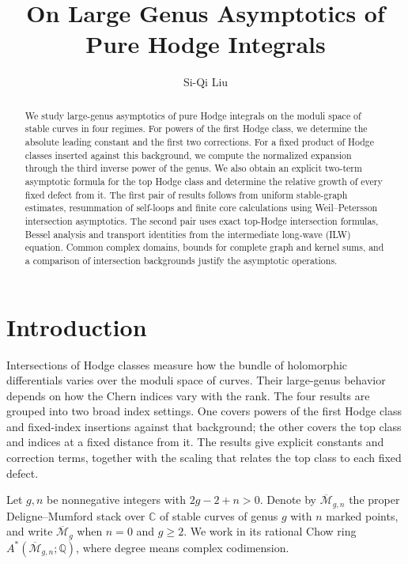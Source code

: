 \documentclass[a4paper,10pt]{article}
\numberwithin{equation}{section}
\newcommand{\MM}{\overline{\mathcal{M}}}
\theoremstyle{paperplain}
\theoremstyle{paperremark}
\theoremstyle{paperplain}
\begin{document}
\title{On Large Genus Asymptotics of \\
Pure Hodge Integrals}
\author{Si-Qi Liu}
\date{}
\maketitle

\begin{abstract}
We study large-genus asymptotics of pure Hodge integrals on the
moduli space of stable curves in four regimes. For powers of the
first Hodge class, we determine the absolute leading constant and
the first two corrections. For a fixed product of Hodge classes
inserted against this background, we compute the normalized expansion
through the third inverse power of the genus. We also obtain an explicit two-term
asymptotic formula for the top Hodge class and determine the
relative growth of every fixed defect from it. The first pair of
results follows from uniform stable-graph estimates, resummation
of self-loops and finite core calculations using Weil--Petersson
intersection asymptotics. The second pair uses exact top-Hodge
intersection formulas, Bessel analysis and transport identities
from the intermediate long-wave (ILW) equation. Common complex domains, bounds for complete
graph and kernel sums, and a comparison of intersection
backgrounds justify the asymptotic operations.
\end{abstract}


\tableofcontents

\section{Introduction}
\label{sec:introduction}

Intersections of Hodge classes measure how the bundle of holomorphic
differentials varies over the moduli space of curves. Their
large-genus behavior depends on how the Chern indices vary with
the rank. The four results are grouped into two broad index
settings. One covers powers of the first Hodge class and fixed-index
insertions against that background; the other covers the top class
and indices at a fixed distance from it. The results give explicit
constants and
correction terms, together with the scaling that relates the top
class to each fixed defect.

Let $g,n$ be nonnegative integers with $2g-2+n>0$.  Denote by
$\MM_{g,n}$ the proper Deligne--Mumford stack over $\mathbb C$ of
stable curves of genus $g$ with $n$ marked points, and write $\MM_g$
when $n=0$ and $g\geq2$.  We work in its rational Chow ring
$A^*(\MM_{g,n};\mathbb Q)$, where degree means complex codimension.
\end{document}
